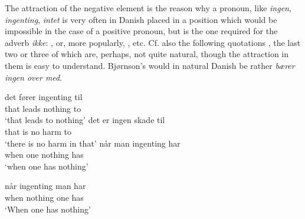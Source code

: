 The attraction of the negative element is the reason why a pronoun, like \textit{ingen},\textit{ ingenting}, \textit{intet} is very often in Danish placed in a position which would be impossible in the case of a positive pronoun, but is the one required for the adverb \textit{ikke}: , or, more popularly, , etc. Cf. also the following quotations , the last two or three of which are, perhaps, not quite natural, though the attraction in them is easy to understand. Bjørnson's  %
would in natural Danish be rather \textit{bærer ingen over med}.

\ea \label{ex:06-19}
\ea
 \gll det fører ingenting til\\
 that leads nothing to\\
\glt `that leads to nothing'
\ex
 \gll det er ingen skade til\\
 that is no harm to\\
\glt `there is no harm in that'
\ex
 \gll når man ingenting har\\ %
 when one nothing has\\
\glt `when one has nothing'
\z
\z

\ea \label{ex:06-22}
\gll når ingenting man har\\
    when nothing one has\\
\glt `When one has nothing'
\z

